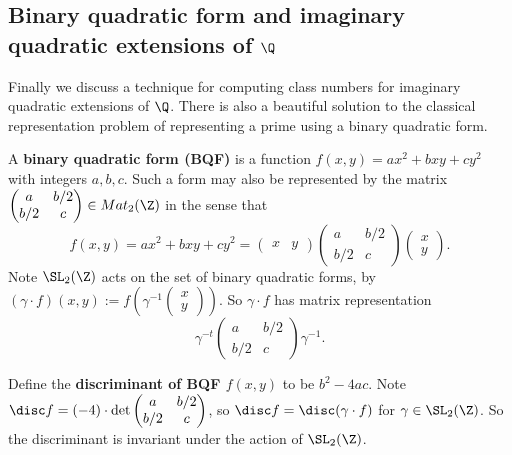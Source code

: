\documentclass[11pt]{amsart}
\begin{document}
\subsection{Binary quadratic form and imaginary quadratic extensions of $\Q$}

Finally we discuss a technique for computing class numbers for imaginary
quadratic extensions of $\Q$. There is also a beautiful solution to the
classical representation problem of representing a prime using a binary
quadratic form.

\medskip

A {\bf binary quadratic form (BQF)}  is a function
$f(x,y) = ax^2 + bxy + cy^2$ with integers $a,b,c$.  Such a form may also be
represented by the matrix $ \begin{pmatrix} a & b/2\\ b/2 & c \end{pmatrix} \in
Mat_2(\Z)$ in the sense that
\[
    f(x,y) =
    ax^2 + bxy + cy^2 =
    \begin{pmatrix}
        x & y
    \end{pmatrix}
    \begin{pmatrix}
        a & b/2\\
        b/2 & c
    \end{pmatrix}
    \begin{pmatrix}
        x\\
        y
    \end{pmatrix}.
\]
Note $\SL_2(\Z)$ acts on the set of binary quadratic forms, by $(\gamma \cdot
f)(x,y) := f(\gamma^{-1} \begin{pmatrix} x\\ y \end{pmatrix})$.  So $\gamma
\cdot f$ has matrix representation
\[
    \gamma^{-t} \begin{pmatrix}
        a & b/2\\
        b/2 & c
    \end{pmatrix}
    \gamma^{-1}.
\]

Define the {\bf discriminant of BQF $f(x,y)$}  to be
$b^2 - 4ac$.  Note $\disc f = (-4) \cdot \det \begin{pmatrix} a & b/2\\ b/2 & c
\end{pmatrix}$, so $\disc f = \disc (\gamma \cdot f)$ for $\gamma \in
\SL_2(\Z)$.  So the discriminant is invariant under the action of $\SL_2(\Z)$.

\medskip
\end{document}
